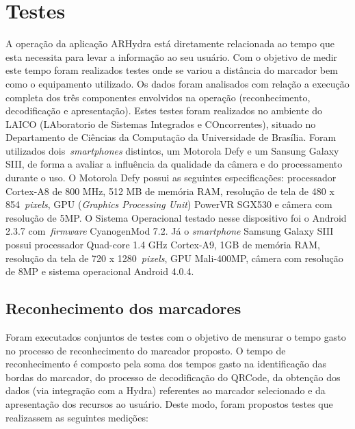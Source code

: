 \section{Testes}
	
	A operação da aplicação ARHydra está diretamente relacionada ao tempo que esta necessita para levar a informação ao 
	seu usuário. Com o objetivo de medir este tempo foram realizados testes onde se variou a distância do marcador 
	bem como o equipamento utilizado. Os dados foram analisados com relação a execução completa dos três componentes 
	envolvidos na operação (reconhecimento, decodificação e apresentação). Estes testes foram realizados no ambiente do 
	LAICO (LAboratorio de Sistemas Integrados e COncorrentes), situado no Departamento de Ciências da Computação da 
	Universidade de Brasília. Foram utilizados dois~\textit{smartphones} distintos, um Motorola Defy e um 
	Sansung Galaxy SIII, de forma a avaliar a influência da qualidade da câmera e do processamento durante o uso. O Motorola 
	Defy possui as seguintes especificações: processador Cortex-A8 de 800 MHz, 512 MB de memória RAM, resolução de tela 
	de 480 x 854~\textit{pixels}, GPU (\textit{Graphics Processing Unit}) PowerVR SGX530 e câmera com resolução de 5MP. 
	O Sistema Operacional testado nesse dispositivo foi o Android 2.3.7 com~\textit{firmware} CyanogenMod 7.2. Já o 
	\textit{smartphone} Samsung Galaxy SIII possui processador Quad-core 1.4 GHz Cortex-A9, 1GB de memória RAM, 
	resolução da tela de 720 x 1280~\textit{pixels}, GPU Mali-400MP, câmera com resolução de 8MP e sistema operacional 
	Android 4.0.4.

\subsection{Reconhecimento dos marcadores}
	
	Foram executados conjuntos de testes com o objetivo de mensurar o tempo gasto no processo de
	reconhecimento do marcador proposto. O tempo de reconhecimento é composto pela soma dos tempos gasto
	na identificação das bordas do marcador, do processo de decodificação do QRCode, da obtenção dos
	dados (via integração com a Hydra) referentes ao marcador selecionado e da apresentação dos
	recursos ao usuário. Deste modo, foram propostos testes que realizassem as seguintes medições:
		
